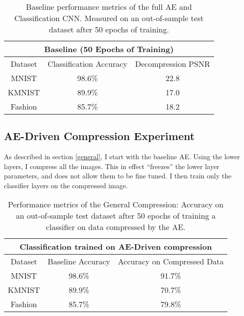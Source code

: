 \documentclass[twoside,11pt]{article}
\begin{document}

\begin{table}[h]
  \centering
  \begin{tabular}{|c||c|c|}
    \hline
    \multicolumn{3}{|c|}{Baseline (50 Epochs of Training)}\\
    \hline
    Dataset & Classification Accuracy & Decompression PSNR \\
    \hline
    MNIST & 98.6\% & 22.8\\
    \hline
    KMNIST & 89.9\% & 17.0\\
    \hline
    Fashion & 85.7\% & 18.2\\
    \hline
  \end{tabular}
  \caption{Baseline performance metrics of the full AE and Classification CNN. 
   Measured on an out-of-sample test dataset after 50 epochs of training.}
  \label{table:base}
\end{table}

\subsection{AE-Driven Compression Experiment}

As described in section \ref{general}, I start with the baseline AE.
Using the lower layers, I compress all the images. This in effect ``freezes'' the 
lower layer parameters, and does not allow them to be fine tuned. 
I then train only the classifier layers on the compressed image.


\begin{table}[h]
  \centering
  \begin{tabular}{|c||c|c|}
    \hline
    \multicolumn{3}{|c|}{Classification trained on AE-Driven compression}\\
    \hline
    Dataset & Baseline Accuracy & Accuracy on Compressed Data \\
    \hline
    MNIST & 98.6\% & 91.7\%\\
    \hline
    KMNIST & 89.9\% & 70.7\%\\
    \hline
    Fashion & 85.7\% & 79.8\%\\
    \hline
  \end{tabular}
  \caption{Performance metrics of the General Compression: 
   Accuracy on an out-of-sample test dataset after 50 epochs of training a classifier on
   data compressed by the AE.}
  \label{table:general}
\end{table}
\end{document}

